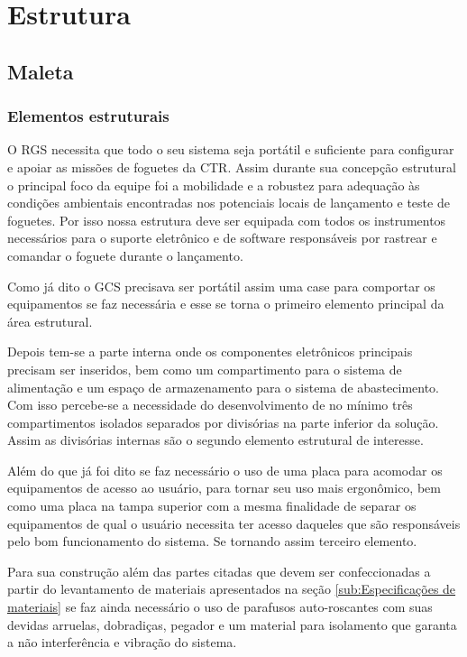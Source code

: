 \section{Estrutura}

\subsection{Maleta}

\subsubsection{Elementos estruturais}

\par O RGS necessita que todo o seu sistema seja portátil e suficiente para configurar e apoiar as missões de foguetes da CTR. Assim durante sua concepção estrutural o principal foco da equipe foi a mobilidade e a robustez para adequação às condições ambientais encontradas nos potenciais locais de lançamento e teste de foguetes. Por isso nossa estrutura deve ser equipada com todos os instrumentos necessários para o suporte eletrônico e de software responsáveis por rastrear e comandar o foguete durante o lançamento.


\par Como já dito o GCS precisava ser portátil assim uma case para comportar os equipamentos se faz necessária e esse se torna o primeiro elemento principal da área estrutural.

\par Depois tem-se a parte interna onde os componentes eletrônicos principais precisam ser inseridos, bem como um compartimento para o sistema de alimentação e um espaço de armazenamento para o sistema de abastecimento. Com isso percebe-se a necessidade do desenvolvimento de no mínimo três compartimentos isolados separados por divisórias na parte inferior da solução. Assim as divisórias internas são o segundo elemento estrutural de interesse. 

\par Além do que já foi dito se faz necessário o uso de uma placa para acomodar os equipamentos de acesso ao usuário, para tornar seu uso mais ergonômico, bem como uma placa na tampa superior com a mesma finalidade de separar os equipamentos de qual o usuário necessita ter acesso daqueles que são responsáveis pelo bom funcionamento do sistema. Se tornando assim terceiro elemento.

\par Para sua construção além das partes citadas que devem ser confeccionadas a partir do levantamento de materiais apresentados na seção \ref{sub:Especificações de materiais} se faz ainda necessário o uso de parafusos auto-roscantes com suas devidas arruelas, dobradiças, pegador e um material para isolamento que garanta a não interferência e vibração do sistema.

